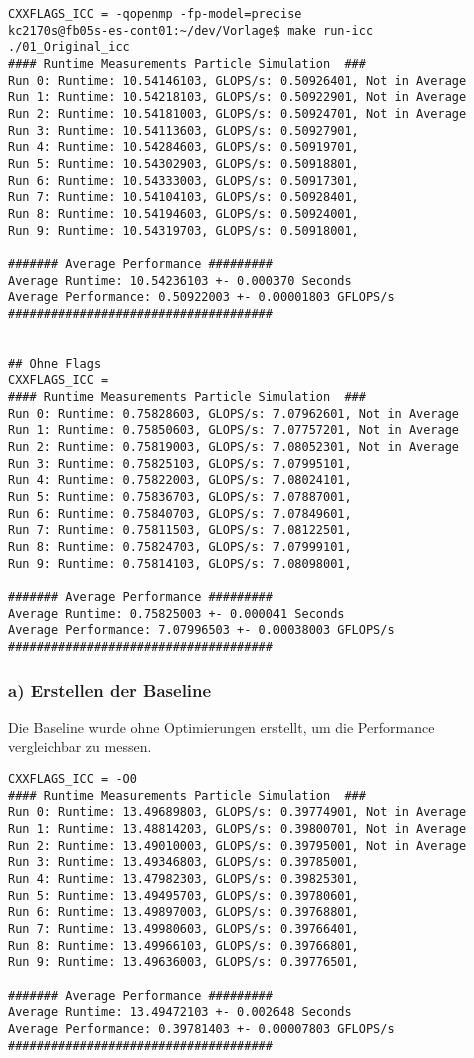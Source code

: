 \documentclass{article}
\begin{document}
\begin{verbatim}
CXXFLAGS_ICC = -qopenmp -fp-model=precise
kc2170s@fb05s-es-cont01:~/dev/Vorlage$ make run-icc
./01_Original_icc
#### Runtime Measurements Particle Simulation  ###
Run 0: Runtime: 10.54146103, GLOPS/s: 0.50926401, Not in Average
Run 1: Runtime: 10.54218103, GLOPS/s: 0.50922901, Not in Average
Run 2: Runtime: 10.54181003, GLOPS/s: 0.50924701, Not in Average
Run 3: Runtime: 10.54113603, GLOPS/s: 0.50927901,    
Run 4: Runtime: 10.54284603, GLOPS/s: 0.50919701,    
Run 5: Runtime: 10.54302903, GLOPS/s: 0.50918801,    
Run 6: Runtime: 10.54333003, GLOPS/s: 0.50917301,    
Run 7: Runtime: 10.54104103, GLOPS/s: 0.50928401,    
Run 8: Runtime: 10.54194603, GLOPS/s: 0.50924001,    
Run 9: Runtime: 10.54319703, GLOPS/s: 0.50918001,    

####### Average Performance #########
Average Runtime: 10.54236103 +- 0.000370 Seconds 
Average Performance: 0.50922003 +- 0.00001803 GFLOPS/s 
#####################################


## Ohne Flags
CXXFLAGS_ICC =
#### Runtime Measurements Particle Simulation  ###
Run 0: Runtime: 0.75828603, GLOPS/s: 7.07962601, Not in Average
Run 1: Runtime: 0.75850603, GLOPS/s: 7.07757201, Not in Average
Run 2: Runtime: 0.75819003, GLOPS/s: 7.08052301, Not in Average
Run 3: Runtime: 0.75825103, GLOPS/s: 7.07995101,    
Run 4: Runtime: 0.75822003, GLOPS/s: 7.08024101,    
Run 5: Runtime: 0.75836703, GLOPS/s: 7.07887001,    
Run 6: Runtime: 0.75840703, GLOPS/s: 7.07849601,    
Run 7: Runtime: 0.75811503, GLOPS/s: 7.08122501,    
Run 8: Runtime: 0.75824703, GLOPS/s: 7.07999101,    
Run 9: Runtime: 0.75814103, GLOPS/s: 7.08098001,    

####### Average Performance #########
Average Runtime: 0.75825003 +- 0.000041 Seconds 
Average Performance: 7.07996503 +- 0.00038003 GFLOPS/s 
#####################################
\end{verbatim}

\subsubsection{a) Erstellen der Baseline}
Die Baseline wurde ohne Optimierungen erstellt, um die Performance vergleichbar zu messen.

\begin{verbatim}
CXXFLAGS_ICC = -O0
#### Runtime Measurements Particle Simulation  ###
Run 0: Runtime: 13.49689803, GLOPS/s: 0.39774901, Not in Average
Run 1: Runtime: 13.48814203, GLOPS/s: 0.39800701, Not in Average
Run 2: Runtime: 13.49010003, GLOPS/s: 0.39795001, Not in Average
Run 3: Runtime: 13.49346803, GLOPS/s: 0.39785001,    
Run 4: Runtime: 13.47982303, GLOPS/s: 0.39825301,    
Run 5: Runtime: 13.49495703, GLOPS/s: 0.39780601,    
Run 6: Runtime: 13.49897003, GLOPS/s: 0.39768801,    
Run 7: Runtime: 13.49980603, GLOPS/s: 0.39766401,    
Run 8: Runtime: 13.49966103, GLOPS/s: 0.39766801,    
Run 9: Runtime: 13.49636003, GLOPS/s: 0.39776501,    

####### Average Performance #########
Average Runtime: 13.49472103 +- 0.002648 Seconds 
Average Performance: 0.39781403 +- 0.00007803 GFLOPS/s 
#####################################
\end{verbatim}
\end{document}
